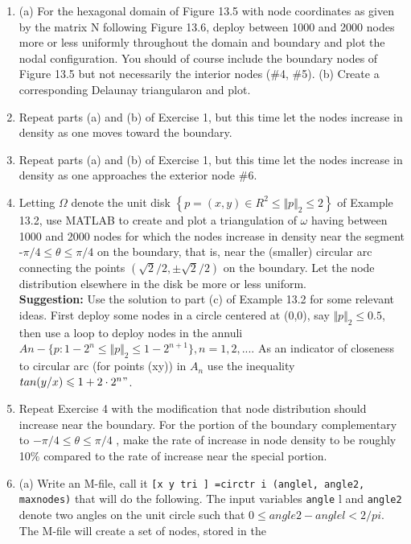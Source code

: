 \documentclass[../main.tex]{subfiles}
\begin{document}
\begin{enumerate}
    \item (a) For the hexagonal domain of Figure 13.5 with node coordinates as given by the matrix N 
following Figure 13.6, deploy between 1000 and 2000 nodes more or less uniformly throughout 
the domain and boundary and plot the nodal configuration. You should of course include the 
boundary nodes of Figure 13.5 but not necessarily the interior nodes ($\#$4, $\#$5). 
(b) Create a corresponding Delaunay triangularon and plot.
    \item Repeat parts (a) and (b) of Exercise 1, but this time let the nodes increase in density as one 
moves toward the boundary. 
    \item Repeat parts (a) and (b) of Exercise 1, but this time let the nodes increase in density as one 
approaches the exterior node $\#6$.
	\item Letting $\Omega$ denote the unit disk $\left\{ p = (x,y) \in  R^2 \leqslant \Vert p \Vert_2 \leqslant 2 \right\}$ of Example 13.2, use MATLAB to 
create and plot a triangulation of $\omega$ having between 1000 and 2000 nodes for which the nodes 
increase in density near the segment -$\pi/4  \leqslant \theta \leqslant \pi/4$ on the boundary, that is, near the (smaller) 
circular arc connecting the points $(\sqrt{2}/2,\pm \sqrt{2}/2)$ on the boundary. Let the node distribution elsewhere in the disk be more or less uniform. 
\\
\textbf{Suggestion:} Use the solution to part (c) of Example 13.2 for some relevant ideas. First deploy 
some nodes in a circle centered at (0,0), say $\Vert p \Vert_2 \leqslant 0.5$, then use a loop to deploy nodes in the 
annuli $An - \lbrace p: 1-2^n \leqslant \Vert p \Vert_2 \leqslant 1-2^{n+1} \rbrace, n = 1, 2,....$ As an indicator of closeness to circular 
arc (for points (xy)) in $A_n$ use the inequality $tan(y/x)\leqslant 1 + 2 \cdot 2^n"$.
	\item Repeat Exercise 4 with the modification that node distribution should increase near the 
boundary. For the portion of the boundary complementary to $-\pi/4 \leqslant \theta \leqslant \pi /4$ , make the rate 
of increase in node density to be roughly 10$\%$ compared to the rate of increase near the special 
portion.
	\item (a) Write an M-file, call it \texttt{[x y tri ] =circtr i (anglel, angle2, maxnodes)} that 
will do the following. The input variables \texttt{angle} l and \texttt{angle2} denote two angles on the unit 
circle such that $0 \leqslant angle2 - anglel < 2/pi$. The M-file will create a set of nodes, stored in the 

\end{enumerate}
\end{document}

